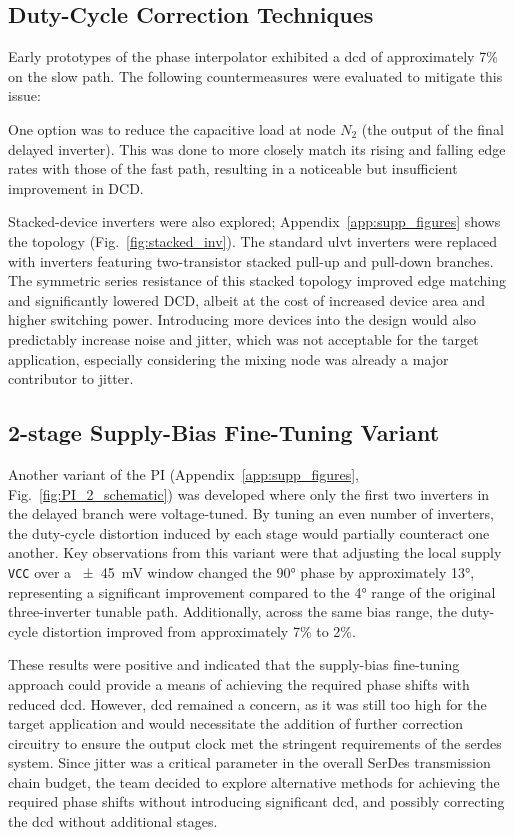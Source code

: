 \subsection{Duty-Cycle Correction Techniques}\label{sec:dcc}

Early prototypes of the phase interpolator exhibited a \gls{dcd} of approximately 7\% on the slow path. The following countermeasures were evaluated to mitigate this issue:

One option was to reduce the capacitive load at node $N_2$ (the output of the final delayed inverter). This was done to more closely match its rising and falling edge rates with those of the fast path, resulting in a noticeable but insufficient improvement in DCD.

Stacked-device inverters were also explored; Appendix~\ref{app:supp_figures} shows the topology (Fig.~\ref{fig:stacked_inv}). The standard \gls{ulvt} inverters were replaced with inverters featuring two-transistor stacked pull-up and pull-down branches. The symmetric series resistance of this stacked topology improved edge matching and significantly lowered DCD, albeit at the cost of increased device area and higher switching power. Introducing more devices into the design would also predictably increase noise and jitter, which was not acceptable for the target application, especially considering the mixing node was already a major contributor to jitter.


\subsection{2-stage Supply-Bias Fine-Tuning Variant}\label{sec:VCC_finetune}

Another variant of the PI (Appendix~\ref{app:supp_figures}, Fig.~\ref{fig:PI_2_schematic}) was developed where only the first two inverters in the delayed branch were voltage-tuned. By tuning an even number of inverters, the duty‑cycle distortion induced by each stage would partially counteract one another. Key observations from this variant were that adjusting the local supply \texttt{VCC} over a \SI{\pm45}{\milli\volt} window changed the \ang{90} phase by approximately \ang{13}, representing a significant improvement compared to the \ang{4} range of the original three-inverter tunable path. Additionally, across the same bias range, the duty-cycle distortion improved from approximately 7\% to 2\%.

These results were positive and indicated that the supply-bias fine-tuning approach could provide a means of achieving the required phase shifts with reduced \gls{dcd}. However, \gls{dcd} remained a concern, as it was still too high for the target application and would necessitate the addition of further correction circuitry to ensure the output clock met the stringent requirements of the \gls{serdes} system. Since jitter was a critical parameter in the overall SerDes transmission chain budget, the team decided to explore alternative methods for achieving the required phase shifts without introducing significant \gls{dcd}, and possibly correcting the \gls{dcd} without additional stages.


